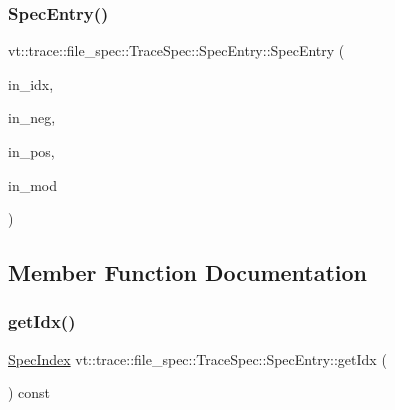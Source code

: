 \mbox{\label{structvt_1_1trace_1_1file__spec_1_1_trace_spec_1_1_spec_entry_a88637cca75e7e629e94194d031f6695b}} 
\subsubsection{\texorpdfstring{Spec\+Entry()}{SpecEntry()}\hspace{0.1cm}{\footnotesize\ttfamily [2/2]}}
{\footnotesize\ttfamily vt\+::trace\+::file\+\_\+spec\+::\+Trace\+Spec\+::\+Spec\+Entry\+::\+Spec\+Entry (\begin{DoxyParamCaption}\item[{\hyperlink{structvt_1_1trace_1_1file__spec_1_1_trace_spec_a4dd2e8fb971930351812d0f286baece2}{Spec\+Index}}]{in\+\_\+idx,  }\item[{\hyperlink{structvt_1_1trace_1_1file__spec_1_1_trace_spec_a4dd2e8fb971930351812d0f286baece2}{Spec\+Index}}]{in\+\_\+neg,  }\item[{\hyperlink{structvt_1_1trace_1_1file__spec_1_1_trace_spec_a4dd2e8fb971930351812d0f286baece2}{Spec\+Index}}]{in\+\_\+pos,  }\item[{bool}]{in\+\_\+mod }\end{DoxyParamCaption})\hspace{0.3cm}{\ttfamily [inline]}}



\subsection{Member Function Documentation}
\mbox{\label{structvt_1_1trace_1_1file__spec_1_1_trace_spec_1_1_spec_entry_a288d88c01c82a6ba85c5565f359b5ba7}} 
\subsubsection{\texorpdfstring{get\+Idx()}{getIdx()}}
{\footnotesize\ttfamily \hyperlink{structvt_1_1trace_1_1file__spec_1_1_trace_spec_a4dd2e8fb971930351812d0f286baece2}{Spec\+Index} vt\+::trace\+::file\+\_\+spec\+::\+Trace\+Spec\+::\+Spec\+Entry\+::get\+Idx (\begin{DoxyParamCaption}{ }\end{DoxyParamCaption}) const\hspace{0.3cm}{\ttfamily [inline]}}



